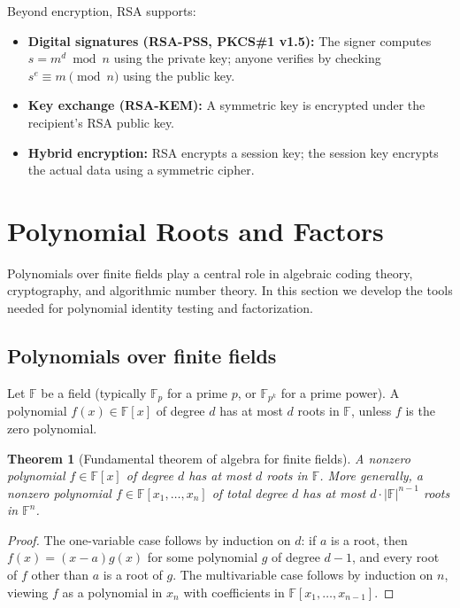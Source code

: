 \documentclass[twoside,12pt]{book}
\theoremstyle{plain}
\newtheorem{theorem}{Theorem}[chapter]
\theoremstyle{definition}
\theoremstyle{remark}
\begin{document}
Beyond encryption, RSA supports:
\begin{itemize}[nosep]
    \item \textbf{Digital signatures (RSA-PSS, PKCS\#1 v1.5):} The signer computes $s = m^d \bmod n$ using the private key; anyone verifies by checking $s^e \equiv m \pmod{n}$ using the public key.
    \item \textbf{Key exchange (RSA-KEM):} A symmetric key is encrypted under the recipient's RSA public key.
    \item \textbf{Hybrid encryption:} RSA encrypts a session key; the session key encrypts the actual data using a symmetric cipher.
\end{itemize}

\section{Polynomial Roots and Factors}
\label{sec:poly-roots}

Polynomials over finite fields play a central role in algebraic coding theory, cryptography, and algorithmic number theory. In this section we develop the tools needed for polynomial identity testing and factorization.

\subsection{Polynomials over finite fields}

Let $\mathbb{F}$ be a field (typically $\mathbb{F}_p$ for a prime $p$, or $\mathbb{F}_{p^k}$ for a prime power). A polynomial $f(x) \in \mathbb{F}[x]$ of degree $d$ has at most $d$ roots in $\mathbb{F}$, unless $f$ is the zero polynomial.

\begin{theorem}[Fundamental theorem of algebra for finite fields]
\label{thm:poly-roots-bounded}
A nonzero polynomial $f \in \mathbb{F}[x]$ of degree $d$ has at most $d$ roots in $\mathbb{F}$. More generally, a nonzero polynomial $f \in \mathbb{F}[x_1, \ldots, x_n]$ of total degree $d$ has at most $d \cdot |\mathbb{F}|^{n-1}$ roots in $\mathbb{F}^n$.
\end{theorem}

\begin{proof}
The one-variable case follows by induction on $d$: if $a$ is a root, then $f(x) = (x - a) g(x)$ for some polynomial $g$ of degree $d-1$, and every root of $f$ other than $a$ is a root of $g$. The multivariable case follows by induction on $n$, viewing $f$ as a polynomial in $x_n$ with coefficients in $\mathbb{F}[x_1, \ldots, x_{n-1}]$.
\end{proof}
\end{document}
